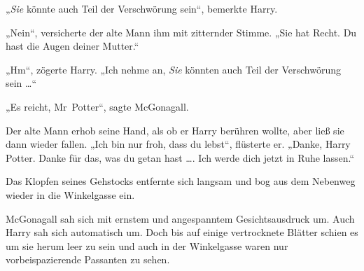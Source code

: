 „\emph{Sie} könnte auch Teil der Verschwörung sein“, bemerkte Harry.

„Nein“, versicherte der alte Mann ihm mit zitternder Stimme.
„Sie hat Recht. Du hast die Augen deiner Mutter.“

„Hm“, zögerte Harry.
„Ich nehme an, \emph{Sie} könnten auch Teil der Verschwörung sein …“

„Es reicht, Mr~Potter“, sagte McGonagall.

Der alte Mann erhob seine Hand, als ob er Harry berühren wollte, aber ließ sie dann wieder fallen.
„Ich bin nur froh, dass du lebst“, flüsterte er.
„Danke, Harry Potter. Danke für das, was du getan hast …. Ich werde dich jetzt in Ruhe lassen.“

Das Klopfen seines Gehstocks entfernte sich langsam und bog aus dem Nebenweg wieder in die Winkelgasse ein.

McGonagall sah sich mit ernstem und angespanntem Gesichtsausdruck um. Auch Harry sah sich automatisch um. Doch bis auf einige vertrocknete Blätter schien es um sie herum leer zu sein und auch in der Winkelgasse waren nur vorbeispazierende Passanten zu sehen.


